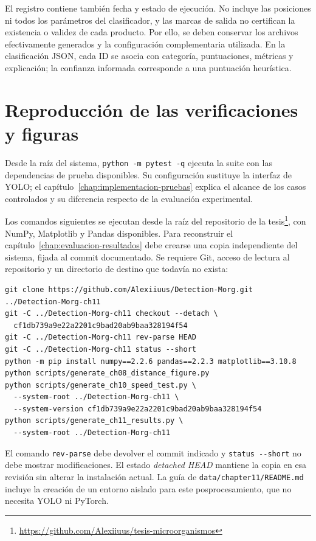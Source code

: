 El registro contiene también fecha y estado de ejecución. No incluye las posiciones ni todos los parámetros del clasificador, y las marcas de salida no certifican la existencia o validez de cada producto. Por ello, se deben conservar los archivos efectivamente generados y la configuración complementaria utilizada. En la clasificación JSON, cada ID se asocia con categoría, puntuaciones, métricas y explicación; la confianza informada corresponde a una puntuación heurística.

\section{Reproducción de las verificaciones y figuras}

Desde la raíz del sistema, \verb|python -m pytest -q| ejecuta la suite con las dependencias de prueba disponibles. Su configuración sustituye la interfaz de YOLO; el capítulo~\ref{chap:implementacion-pruebas} explica el alcance de los casos controlados y su diferencia respecto de la evaluación experimental.

Los comandos siguientes se ejecutan desde la raíz del repositorio de la tesis\footnote{\url{https://github.com/Alexiiuus/tesis-microorganismos}}, con NumPy, Matplotlib y Pandas disponibles. Para reconstruir el capítulo~\ref{chap:evaluacion-resultados} debe crearse una copia independiente del sistema, fijada al commit documentado. Se requiere Git, acceso de lectura al repositorio y un directorio de destino que todavía no exista:

\noindent\begin{minipage}{\linewidth}
\begin{lstlisting}[style=thesiscode]
git clone https://github.com/Alexiiuus/Detection-Morg.git ../Detection-Morg-ch11
git -C ../Detection-Morg-ch11 checkout --detach \
  cf1db739a9e22a2201c9bad20ab9baa328194f54
git -C ../Detection-Morg-ch11 rev-parse HEAD
git -C ../Detection-Morg-ch11 status --short
python -m pip install numpy==2.2.6 pandas==2.2.3 matplotlib==3.10.8
python scripts/generate_ch08_distance_figure.py
python scripts/generate_ch10_speed_test.py \
  --system-root ../Detection-Morg-ch11 \
  --system-version cf1db739a9e22a2201c9bad20ab9baa328194f54
python scripts/generate_ch11_results.py \
  --system-root ../Detection-Morg-ch11
\end{lstlisting}
\end{minipage}\par

El comando \verb|rev-parse| debe devolver el commit indicado y \verb|status --short| no debe mostrar modificaciones. El estado \textit{detached HEAD} mantiene la copia en esa revisión sin alterar la instalación actual. La guía de \nolinkurl{data/chapter11/README.md} incluye la creación de un entorno aislado para este posprocesamiento, que no necesita YOLO ni PyTorch.

